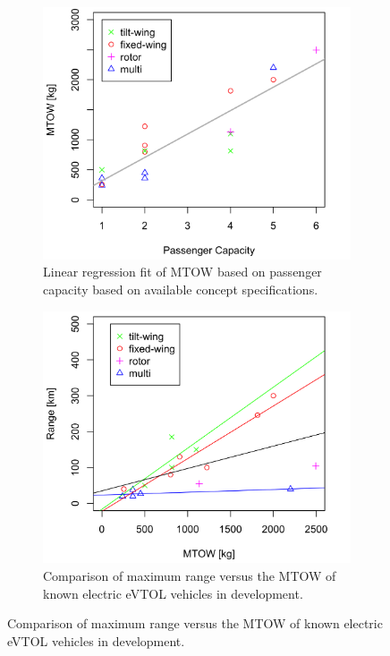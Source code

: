 \vspace{-4mm}

\begin{figure}[H]
\begin{subfigure}[t]{0.5\textwidth}
    \centering
    \includegraphics[width=\textwidth]{Figures/MTOW-Pax.png}
    \captionsetup{width=.8\linewidth}
    \caption{Linear regression fit of MTOW based on passenger capacity based on available concept specifications.}
    \label{fig:MTOW-Pax}
\end{subfigure}
\begin{subfigure}[t]{0.5\textwidth}
    \centering
    \includegraphics[width=\textwidth]{Figures/MTOW-Range.png}
    \captionsetup{width=.8\linewidth}
    \caption{Comparison of maximum range versus the MTOW of known electric eVTOL vehicles in development.}
    \label{fig:MTOW-Range}
\end{subfigure}
\label{fig:MTOW-stats}
\end{figure}

